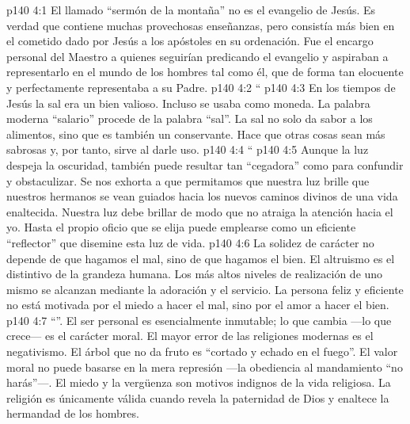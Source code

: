 \vs p140 4:1 El llamado “sermón de la montaña” no es el evangelio de Jesús. Es verdad que contiene muchas provechosas enseñanzas, pero consistía más bien en el cometido dado por Jesús a los apóstoles en su ordenación. Fue el encargo personal del Maestro a quienes seguirían predicando el evangelio y aspiraban a representarlo en el mundo de los hombres tal como él, que de forma tan elocuente y perfectamente representaba a su Padre.
\vs p140 4:2 \pc “
\vs p140 4:3 En los tiempos de Jesús la sal era un bien valioso. Incluso se usaba como moneda. La palabra moderna “salario” procede de la palabra “sal”. La sal no solo da sabor a los alimentos, sino que es también un conservante. Hace que otras cosas sean más sabrosas y, por tanto, sirve al darle uso.
\vs p140 4:4 \pc “
\vs p140 4:5 Aunque la luz despeja la oscuridad, también puede resultar tan “cegadora” como para confundir y obstaculizar. Se nos exhorta a que permitamos que nuestra luz brille  que nuestros hermanos se vean guiados hacia los nuevos caminos divinos de una vida enaltecida. Nuestra luz debe brillar de modo que no atraiga la atención hacia el yo. Hasta el propio oficio que se elija puede emplearse como un eficiente “reflector” que disemine esta luz de vida.
\vs p140 4:6 La solidez de carácter no depende de que  hagamos el mal, sino de que hagamos el bien. El altruismo es el distintivo de la grandeza humana. Los más altos niveles de realización de uno mismo se alcanzan mediante la adoración y el servicio. La persona feliz y eficiente no está motivada por el miedo a hacer el mal, sino por el amor a hacer el bien.
\vs p140 4:7 \pc “”. El ser personal es esencialmente inmutable; lo que cambia ---lo que crece--- es el carácter moral. El mayor error de las religiones modernas es el negativismo. El árbol que no da fruto es “cortado y echado en el fuego”. El valor moral no puede basarse en la mera represión ---la obediencia al mandamiento “no harás”---. El miedo y la vergüenza son motivos indignos de la vida religiosa. La religión es únicamente válida cuando revela la paternidad de Dios y enaltece la hermandad de los hombres.
